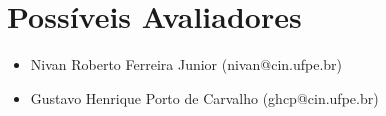 \section{Possíveis Avaliadores}

\begin{itemize}
    \item Nivan Roberto Ferreira Junior (nivan@cin.ufpe.br)
    \item Gustavo Henrique Porto de Carvalho (ghcp@cin.ufpe.br)
\end{itemize}